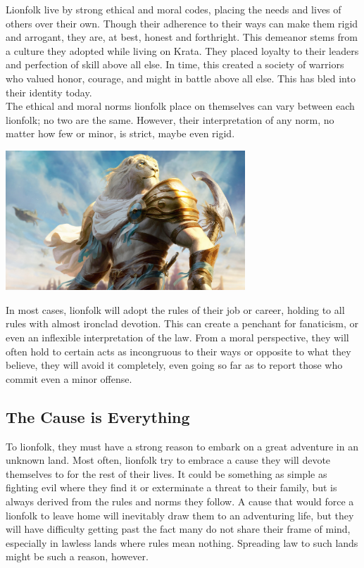 \documentclass[10pt,twoside,twocolumn,openany]{book}
\begin{document}
Lionfolk live by strong ethical and moral codes, placing the needs and lives of others over their own. Though their adherence to their ways can make them rigid and arrogant, they are, at best, honest and forthright. This demeanor stems from a culture they adopted while living on Krata. They placed loyalty to their leaders and perfection of skill above all else. In time, this created a society of warriors who valued honor, courage, and might in battle above all else. This has bled into their identity today.\\
The ethical and moral norms lionfolk place on themselves can vary between each lionfolk; no two are the same. However, their interpretation of any norm, no matter how few or minor, is strict, maybe even rigid. 
\begin{center}
	\includegraphics[width=90mm,scale=0.5]{img/lionfolk.jpg}
\end{center}
In most cases, lionfolk will adopt the rules of their job or career, holding to all rules with almost ironclad devotion. This can create a penchant for fanaticism, or even an inflexible interpretation of the law. From a moral perspective, they will often hold to certain acts as incongruous to their ways or opposite to what they believe, they will avoid it completely, even going so far as to report those who commit even a minor offense.

\subsection{The Cause is Everything}

To lionfolk, they must have a strong reason to embark on a great adventure in an unknown land. Most often, lionfolk try to embrace a cause they will devote themselves to for the rest of their lives. It could be something as simple as fighting evil where they find it or exterminate a threat to their family, but is always derived from the rules and norms they follow. A cause that would force a lionfolk to leave home will inevitably draw them to an adventuring life, but they will have difficulty getting past the fact many do not share their frame of mind, especially in lawless lands where rules mean nothing. Spreading law to such lands might be such a reason, however.
\end{document}
